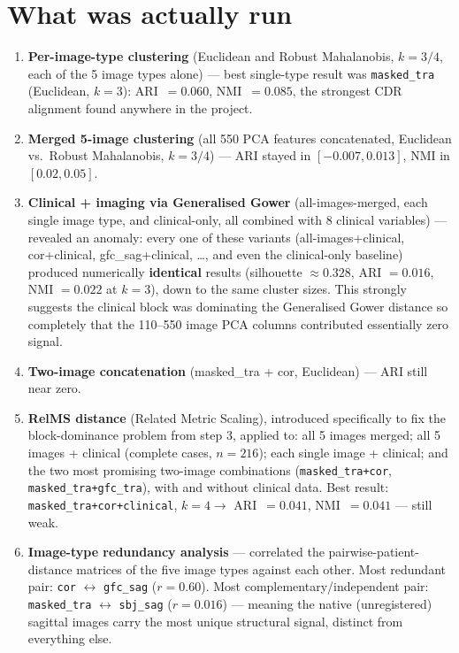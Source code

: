 \documentclass[11pt]{article}
\newcommand{\code}[1]{\texttt{#1}}
\begin{document}
\section*{What was actually run}
\begin{enumerate}[leftmargin=1.4em, itemsep=0.4em]
  \item \textbf{Per-image-type clustering} (Euclidean and Robust Mahalanobis, $k=3/4$, each of the
  5 image types alone) --- best single-type result was \code{masked\_tra} (Euclidean, $k=3$):
  ARI~$=0.060$, NMI~$=0.085$, the strongest CDR alignment found anywhere in the project.

  \item \textbf{Merged 5-image clustering} (all 550 PCA features concatenated, Euclidean vs.\
  Robust Mahalanobis, $k=3/4$) --- ARI stayed in $[-0.007, 0.013]$, NMI in $[0.02, 0.05]$.

  \item \textbf{Clinical + imaging via Generalised Gower} (all-images-merged, each single image
  type, and clinical-only, all combined with 8 clinical variables) --- revealed an anomaly: every
  one of these variants (all-images+clinical, cor+clinical, gfc\_sag+clinical, \ldots, and even
  the clinical-only baseline) produced numerically \textbf{identical} results (silhouette
  $\approx 0.328$, ARI $=0.016$, NMI $=0.022$ at $k=3$), down to the same cluster sizes. This
  strongly suggests the clinical block was dominating the Generalised Gower distance so completely
  that the 110--550 image PCA columns contributed essentially zero signal.

  \item \textbf{Two-image concatenation} (masked\_tra + cor, Euclidean) --- ARI still near zero.

  \item \textbf{RelMS distance} (Related Metric Scaling), introduced specifically to fix the
  block-dominance problem from step 3, applied to: all 5 images merged; all 5 images + clinical
  (complete cases, $n=216$); each single image + clinical; and the two most promising two-image
  combinations (\code{masked\_tra+cor}, \code{masked\_tra+gfc\_tra}), with and without clinical
  data. Best result: \code{masked\_tra+cor+clinical}, $k=4 \rightarrow$ ARI~$=0.041$,
  NMI~$=0.041$ --- still weak.

  \item \textbf{Image-type redundancy analysis} --- correlated the pairwise-patient-distance
  matrices of the five image types against each other. Most redundant pair: \code{cor}
  $\leftrightarrow$ \code{gfc\_sag} ($r=0.60$). Most complementary/independent pair:
  \code{masked\_tra} $\leftrightarrow$ \code{sbj\_sag} ($r=0.016$) --- meaning the native
  (unregistered) sagittal images carry the most unique structural signal, distinct from
  everything else.


\end{enumerate}
\end{document}

